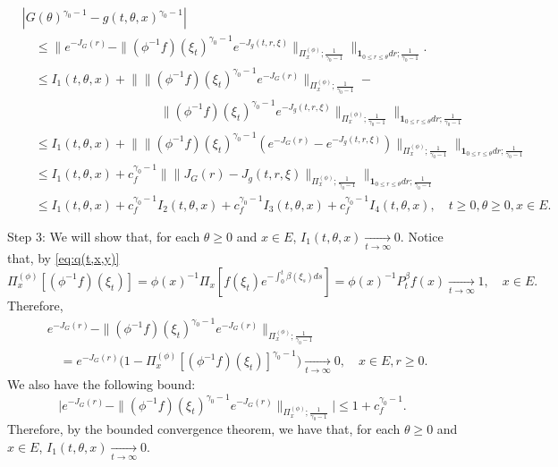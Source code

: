 \documentclass[12pt, a4paper]{amsart}
\theoremstyle{definition}
\numberwithin{equation}{section}
\begin{document}
\[\begin{split}
	&|  G(\theta)^{\gamma_0 - 1} - g(t,\theta,x)^{\gamma_0 - 1} |
	\\&\quad \leq \Big\| e^{ - J_G(r)} - \| (\phi^{-1}f)(\xi_t)^{\gamma_0 - 1} e^{-J_g(t, r,\xi)} \|_{\Pi_x^{(\phi)};\frac{1}{\gamma_0 - 1}} \Big\|_{\mathbf 1_{0\leq r\leq \theta} dr;\frac{1}{\gamma_0 - 1}}.
	\\&\quad \leq I_1(t,\theta,x) + \Big\| \| (\phi^{-1}f)(\xi_t)^{\gamma_0 - 1} e^{-J_G(r)} \|_{\Pi_x^{(\phi)};\frac{1}{\gamma_0 - 1}} -
	\\&\quad \qquad \qquad \qquad \qquad \qquad \| (\phi^{-1}f)(\xi_t)^{\gamma_0 - 1} e^{-J_g(t,r,\xi)} \|_{\Pi_x^{(\phi)};\frac{1}{\gamma_0 - 1}} \Big\|_{\mathbf 1_{0\leq r\leq \theta} dr;\frac{1}{\gamma_0 - 1}}
	\\&\quad \leq I_1(t,\theta,x) + \Big\| \|  (\phi^{-1}f)(\xi_t)^{\gamma_0 - 1} ( e^{-J_G(r)} - e^{-J_g(t,r,\xi)} )  \|_{\Pi_x^{(\phi)};\frac{1}{\gamma_0 - 1}} \Big\|_{\mathbf 1_{0\leq r\leq \theta} dr;\frac{1}{\gamma_0 - 1}}
	\\&\quad \leq I_1(t,\theta,x) + c_f^{\gamma_0 - 1}\Big\| \|  J_G(r) -J_g(t,r,\xi)  \|_{\Pi_x^{(\phi)};\frac{1}{\gamma_0 - 1}} \Big\|_{\mathbf 1_{0\leq r\leq \theta} dr;\frac{1}{\gamma_0 - 1}}
	\\&\quad \leq I_1(t,\theta,x) + c_f^{\gamma_0 - 1} I_2(t,\theta,x) +c_f^{\gamma_0 - 1} I_3(t,\theta,x)+c_f^{\gamma_0 - 1} I_4(t,\theta,x),
	\quad t\geq 0, \theta \geq 0, x\in E.
\end{split}\]
	
	Step 3: We will show that, for each $\theta \geq 0$ and $x\in E$, $I_1(t,\theta,x) \xrightarrow[t\to \infty]{} 0$.
	Notice that,
	by \eqref{eq:q(t,x,y)}
\[
	\Pi_x^{(\phi)} [(\phi^{-1}f)(\xi_t)]
	= \phi(x)^{-1}\Pi_x[f(\xi_t) e^{- \int_0^t \beta(\xi_s) ds}]
	= \phi(x)^{-1} P^\beta_t f(x)
	\xrightarrow[t\to \infty]{} 1,
	\quad x\in E.
\]
	Therefore,
\[\begin{split}
	&e^{ - J_G(r)} - \| (\phi^{-1}f)(\xi_t)^{\gamma_0 - 1} e^{-J_G(r)} \|_{\Pi_x^{(\phi)};\frac{1}{\gamma_0 - 1}}
	\\&\quad =e^{ - J_G(r)} \Big( 1   -  \Pi_x^{(\phi)}[ (\phi^{-1}f)(\xi_t) ]^{\gamma_0 - 1}   \Big)
	\xrightarrow[t\to \infty]{} 0,
	\quad x\in E, r\geq 0.
\end{split}\]
	We also have the following bound:
\[
	\Big| e^{ - J_G(r)} - \| (\phi^{-1}f)(\xi_t)^{\gamma_0 - 1} e^{-J_G(r)} \|_{\Pi_x^{(\phi)};\frac{1}{\gamma_0 - 1}} \Big|
	\leq 1+ c_f^{\gamma_0 - 1}.
\]
	Therefore, by the bounded convergence theorem, we have that, for each $\theta \geq 0$ and $x\in E$, $I_1(t,\theta, x) \xrightarrow[t\to \infty]{} 0$.
	
\end{document}
